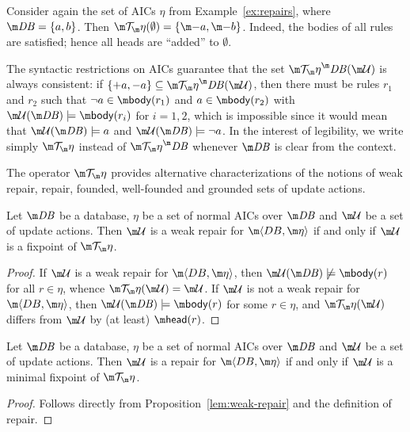 
\begin{example}
  Consider again the set of AICs $\eta$ from Example~\ref{ex:repairs}, where
  $\db=\{a,b\}$.
  Then $\Op(\emptyset)=\{\remove a, \remove b\}$. Indeed, the bodies of all rules are satisfied; hence all heads are ``added'' to $\emptyset$. 
\end{example}

The syntactic restrictions on AICs guarantee that the set $\Op^\db(\UU)$ is always consistent: if $\{+a,-a\}\subseteq\Op^\db(\UU)$, then there must be rules $r_1$ and $r_2$ such that $\neg a\in\body(r_1)$ and $a\in\body(r_2)$ with $\UU(\db)\models\body(r_i)$ for $i=1,2$, which is impossible since it would mean that $\UU(\db)\models a$ and $\UU(\db)\models \lnot a$.
In the interest of legibility, we write simply $\Op$ instead of $\Op^\db$ whenever $\db$ is clear from the context.

The operator $\Op$ provides alternative characterizations of the notions of weak repair, repair, founded, well-founded and grounded sets of update actions.

\begin{proposition}
  \label{lem:weak-repair}
  Let $\db$ be a database, $\eta$ be a set of normal AICs over $\db$ and $\UU$ be a set of update actions.
  Then $\UU$ is a weak repair for $\fulldb$ if and only if $\UU$ is a fixpoint of $\Op$.
\end{proposition}
\begin{proof}
  If $\UU$ is a weak repair for $\fulldb$, then $\UU(\db)\not\models\body(r)$ for all $r\in\eta$, whence $\Op(\UU)=\UU$.
  If $\UU$ is not a weak repair for $\fulldb$, then $\UU(\db)\models\body(r)$ for some $r\in\eta$, and $\Op(\UU)$ differs from $\UU$ by (at least) $\head(r)$.
\end{proof}

\begin{proposition}
  \label{lem:repair}
  Let $\db$ be a database, $\eta$ be a set of normal AICs over $\db$ and $\UU$ be a set of update actions.
  Then $\UU$ is a repair for $\fulldb$ if and only if $\UU$ is a minimal fixpoint of $\Op$.
\end{proposition}
\begin{proof}
  Follows directly from Proposition~\ref{lem:weak-repair} and the definition of repair.
\end{proof}


